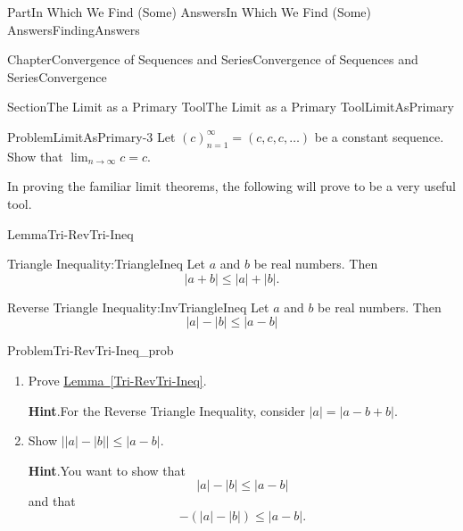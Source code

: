 \documentclass[oneside,10pt,]{book}
\newcommand{\blocktitlefont}{\relax}
\newcommand{\xreffont}{\relax}
\numberwithin{equation}{part}
\newcommand{\abs}[1]{\left|#1\right|}
\def\limitt#1#2#3{{\displaystyle\lim_{#1\rightarrow #2}\textstyle #3}}
\begin{document}
\begin{partptx}{Part}{In Which We Find (Some) Answers}{}{In Which We Find (Some) Answers}{}{}{FindingAnswers}
\begin{chapterptx}{Chapter}{Convergence of Sequences and Series}{}{Convergence of Sequences and Series}{}{}{Convergence}
\begin{sectionptx}{Section}{The Limit as a Primary Tool}{}{The Limit as a Primary Tool}{}{}{LimitAsPrimary}
\begin{problem}{Problem}{}{LimitAsPrimary-3}%
Let \(\left(c\right)_{n=1}^\infty=(c,c,c,\ldots)\) be a constant sequence.  Show that \(\limitt{n}{\infty}{c}=c\).%
\end{problem}
In proving the familiar limit theorems, the following will prove to be a very useful tool.%
\begin{lemma}{Lemma}{}{}{Tri-RevTri-Ineq}%
%
%
\begin{descriptionlist}
\begin{dlimedium}{Triangle Inequality:}{TriangleIneq}%
Let \(a\) and \(b\) be real numbers. Then%
\begin{equation*}
\abs{a+b}\leq \abs{a}+\abs{b}\text{.}
\end{equation*}
%
\end{dlimedium}%
\begin{dlimedium}{Reverse Triangle Inequality:}{InvTriangleIneq}%
Let \(a\) and \(b\) be real numbers. Then%
\begin{equation*}
\abs{a}-\abs{b}\leq\abs{a-b}
\end{equation*}
%
\end{dlimedium}%
\end{descriptionlist}
%
\end{lemma}
\begin{problem}{Problem}{}{Tri-RevTri-Ineq_prob}%
\begin{enumerate}[font=\bfseries,label=(\alph*),ref=\alph*]%
\item{}Prove \hyperref[Tri-RevTri-Ineq]{Lemma~{\xreffont\ref{Tri-RevTri-Ineq}}}.%
\par\smallskip%
\noindent\textbf{\blocktitlefont Hint}.\hypertarget{Tri-RevTri-Ineq_prob-2-2}{}\quad{}For the Reverse Triangle Inequality, consider \(\abs{a}=\abs{a-b+b}\).%
\item{}Show \(\Big||a|-|b|\Big|\leq|a-b|\).%
\par\smallskip%
\noindent\textbf{\blocktitlefont Hint}.\hypertarget{Tri-RevTri-Ineq_prob-3-2}{}\quad{}You want to show that%
\begin{equation*}
|a|-|b|\leq|a-b|
\end{equation*}
and that%
\begin{equation*}
-\left(|a|-|b|\right)\leq|a-b|\text{.}
\end{equation*}
%
\end{enumerate}%
\end{problem}

\end{sectionptx}
\end{chapterptx}
\end{partptx}
\end{document}
